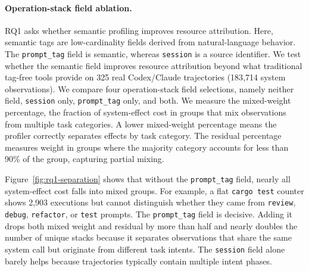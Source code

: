 \documentclass[letterpaper]{article}
\begin{document}
\paragraph{Operation-stack field ablation.}
RQ1 asks whether semantic profiling improves resource attribution.
Here, semantic tags are low-cardinality fields derived from natural-language
behavior. The \texttt{prompt\_tag} field is semantic, whereas
\texttt{session} is a source identifier.
We test whether the semantic field improves resource attribution beyond what
traditional tag-free tools provide on 325 real Codex/Claude trajectories
(183{,}714 system observations).
We compare four operation-stack field selections, namely neither field,
\texttt{session} only, \texttt{prompt\_tag} only, and both. We measure the
mixed-weight percentage, the fraction of system-effect cost in groups that mix
observations from multiple task categories.
A lower mixed-weight percentage means the profiler correctly separates effects by task category.
The residual percentage measures weight in groups where the majority category accounts for less than 90\% of the group, capturing partial mixing.

Figure~\ref{fig:rq1-separation} shows that without the
\texttt{prompt\_tag} field, nearly all system-effect cost falls into mixed
groups.
For example, a flat \texttt{cargo~test} counter shows 2{,}903 executions but
cannot distinguish whether they came from \texttt{review}, \texttt{debug},
\texttt{refactor}, or \texttt{test} prompts.
The \texttt{prompt\_tag} field is decisive. Adding it drops both mixed weight and
residual by more than half and nearly doubles the number of unique stacks
because it separates observations that share the same system call but originate
from different task intents.
The \texttt{session} field alone barely helps because trajectories typically
contain multiple intent phases.
\end{document}

